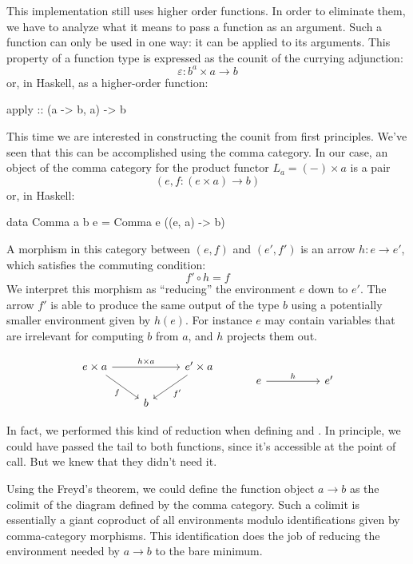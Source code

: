 \documentclass[DaoFP]{subfiles}
\begin{document}
This implementation still uses higher order functions. In order to eliminate them, we have to analyze what it means to pass a function as an argument. Such a function can only be used in one way: it can be applied to its arguments. This property of a function type is expressed as the counit of the currying adjunction:
\[ \varepsilon \colon b^a \times a \to b \]
or, in Haskell, as a higher-order function:
\begin{haskell}
apply :: (a -> b, a) -> b
\end{haskell}
This time we are interested in constructing the counit from first principles. We've seen that this can be accomplished using the comma category. In our case, an object of the comma category for the product functor $L_a = (-) \times a$ is a pair 
\[(e, f \colon (e \times a) \to b) \]
or, in Haskell:
\begin{haskell}
data Comma a b e = Comma e ((e, a) -> b)
\end{haskell}
A morphism in this category between $(e, f)$ and $(e', f')$ is an arrow $h \colon e \to e'$, which satisfies the commuting condition:
\[ f' \circ h = f \]
We interpret this morphism as ``reducing'' the environment $e$ down to $e'$. The arrow $f'$ is able to produce the same output of the type $b$ using a potentially smaller environment given by $h (e)$. For instance $e$ may contain variables that are irrelevant for computing $b$ from $a$, and $h$ projects them out. 

\[
 \begin{tikzcd}
 e \times a
 \arrow[rd, "f"']
 \arrow[rr, "h \times a"]
 && e' \times a
 \arrow[ld, "f'"]
 \\
 &b
  \end{tikzcd}
 \hspace{30pt}
\begin{tikzcd}
 e
 \arrow[rr, "h"]
 && e'
  \end{tikzcd}
\]


In fact, we performed this kind of reduction when defining  and . In principle, we could have passed the tail  to both functions, since it's accessible at the point of call. But we knew that they didn't need it.

Using the Freyd's theorem, we could define the function object $a \to b$ as the colimit of the diagram defined by the comma category. Such a colimit is essentially a giant coproduct of all environments modulo identifications given by comma-category morphisms. This identification does the job of reducing the environment needed by $a \to b$ to the bare minimum. 
\end{document}
